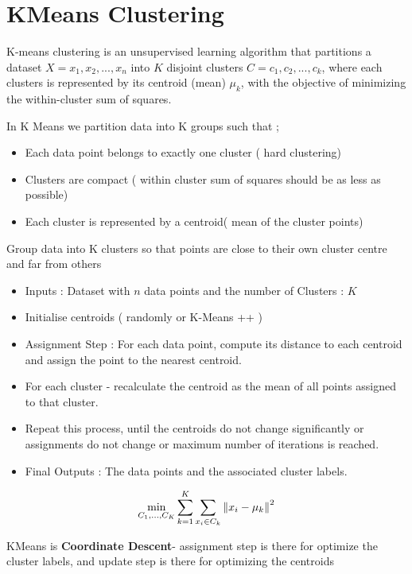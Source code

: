 \documentclass[10pt,a4paper]{article}
\begin{document}
	\section{KMeans Clustering}

	K-means clustering is an unsupervised learning algorithm that partitions a dataset $X={x_1,x_2,...,x_n}$ into $K$ disjoint clusters $C={c_1,c_2,...,c_k}$, where each clusters is represented by its centroid (mean) $\mu_{k}$, with the objective of minimizing the within-cluster sum of squares.

	In K Means we partition data into K groups such that ;

	\begin{itemize}
		\item Each data point belongs to exactly one cluster ( hard clustering)
		\item Clusters are compact ( within cluster sum of squares should be as less as possible)
		\item Each cluster is represented by a centroid( mean of the cluster points)
	\end{itemize}

	Group data into K clusters so that points are close to their own cluster centre and far from others

	\begin{itemize}
		\item Inputs : Dataset with $n$ data points and the number of Clusters : $K$
		\item Initialise centroids ( randomly or K-Means ++ )
		\item Assignment Step : For each data point, compute its distance to each centroid and assign the point to the nearest centroid.
		\item For each cluster - recalculate the centroid as the mean of all points assigned to that cluster.
		\item Repeat this process, until the centroids do not change significantly or assignments do not change or maximum number of iterations is reached.
		\item Final Outputs : The data points and the associated cluster labels.
	\end{itemize}


	\begin{align*}\Large\underset{C_1,\dots,C_K}{\min}\sum_{k=1}^{K}\sum_{x_i \in C_k}\left\| x_i - \mu_k \right\|^2\end{align*}


	KMeans is \textbf{Coordinate Descent}- assignment step is there for optimize the cluster labels, and update step is there for optimizing the centroids
\end{document}
